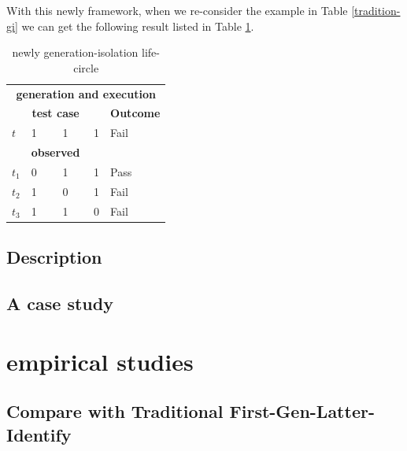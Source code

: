 \documentclass{sig-alternate}
\begin{document}





With this newly framework, when we re-consider the example in Table \ref{tradition-gi} we can get the following result listed in Table \ref{new-gi}.
\begin{table}[h]
\caption{newly generation-isolation life-circle}
\label{new-gi}
\center
\begin{tabular}{llllll}
\multicolumn{6}{c}{\bfseries generation and execution} \\
\multicolumn{5}{c}{\bfseries test case} & \bfseries Outcome \\
 $t$ & \multicolumn{4}{l}{1 \ \ \ \ 1 \ \ \ \  1 } & Fail \\
 \hline
\multicolumn{5}{c}{\bfseries observed} &  \\
$t_{1}$ &\multicolumn{4}{l}{0  \ \ \ \  1 \ \ \ \  1 }& Pass \\
$t_{2}$ &\multicolumn{4}{l}{1  \ \ \ \  0 \ \ \ \  1 } & Fail \\
$t_{3}$ &\multicolumn{4}{l}{1  \ \ \ \  1 \ \ \ \  0 } & Fail \\
\end{tabular}
\end{table}

\subsection{Description}


\subsection{A case study}

\section{empirical studies}

\subsection{Compare with Traditional First-Gen-Latter-Identify}
\end{document}
